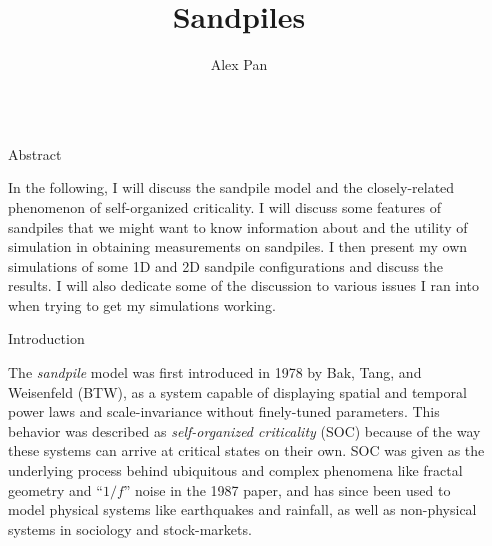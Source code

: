 \documentclass[final]{beamer}
\title{Sandpiles} %
\author{Alex Pan} %
\institute{Reed College} %
\newlength{\sepwid}
\newlength{\onecolwid}
\begin{document}

\setlength{\belowcaptionskip}{2ex} %
\setlength\belowdisplayshortskip{2ex} %

\begin{frame}[t] %

\begin{columns}[t] %

\begin{column}{\sepwid}\end{column} %

\begin{column}{\onecolwid} %


\begin{alertblock}{Abstract}

In the following, I will discuss the sandpile model and the closely-related phenomenon of self-organized criticality. I will discuss some features of sandpiles that we might want to know information about and the utility of simulation in obtaining measurements on sandpiles. I then present my own simulations of some 1D and 2D sandpile configurations and discuss the results. I will also dedicate some of the discussion to various issues I ran into when trying to get my simulations working.

\end{alertblock}


\begin{block}{Introduction}

The \textit{sandpile} model was first introduced in 1978 by Bak, Tang, and Weisenfeld (BTW),  as a system capable of displaying spatial and temporal power laws and scale-invariance without finely-tuned parameters. This behavior was described as \textit{self-organized criticality} (SOC) because of the way these systems can arrive at critical states on their own. SOC was given as the underlying process behind ubiquitous and complex phenomena like fractal geometry and ``$1/f$'' noise in the 1987 paper, and has since been used to model physical systems like earthquakes and rainfall, as well as non-physical systems in sociology and stock-markets.


\end{block}
\end{column}
\end{columns}
\end{frame}
\end{document}
